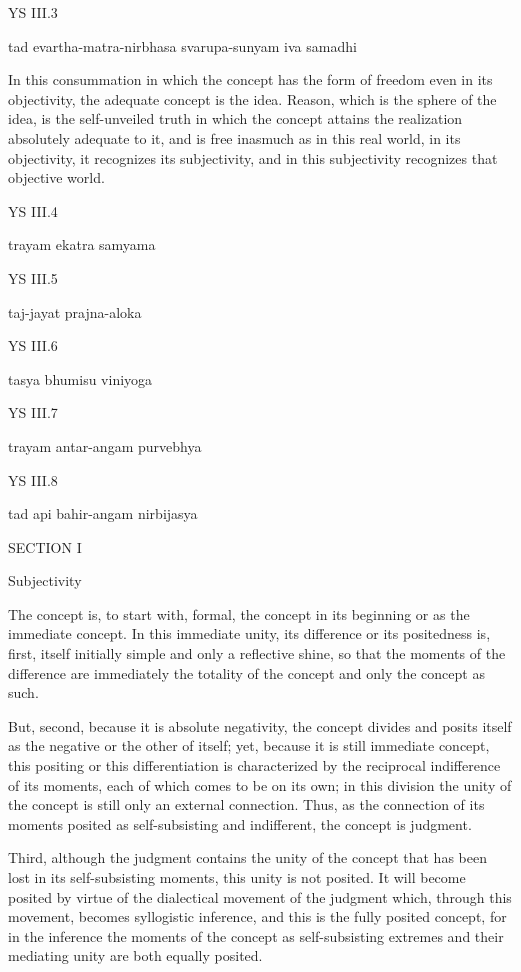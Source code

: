 YS III.3

    tad evartha-matra-nirbhasa svarupa-sunyam iva samadhi

In this consummation in which
the concept has the form of freedom
even in its objectivity,
the adequate concept is the idea.
Reason, which is the sphere of the idea,
is the self-unveiled truth
in which the concept attains
the realization absolutely adequate to it,
and is free inasmuch as in this real world,
in its objectivity, it recognizes its subjectivity,
and in this subjectivity recognizes that objective world.

YS III.4

    trayam ekatra samyama

YS III.5

    taj-jayat prajna-aloka

YS III.6

    tasya bhumisu viniyoga

YS III.7

    trayam antar-angam purvebhya

YS III.8

    tad api bahir-angam nirbijasya

SECTION I

Subjectivity

The concept is, to start with, formal,
the concept in its beginning
or as the immediate concept.
In this immediate unity,
its difference or its positedness
is, first, itself initially simple
and only a reflective shine,
so that the moments of the difference
are immediately the totality of the concept
and only the concept as such.

But, second, because it is absolute negativity,
the concept divides and posits itself
as the negative or the other of itself;
yet, because it is still immediate concept,
this positing or this differentiation is
characterized by the reciprocal
indifference of its moments,
each of which comes to be on its own;
in this division the unity of the concept is
still only an external connection.
Thus, as the connection of its moments
posited as self-subsisting and indifferent,
the concept is judgment.

Third, although the judgment contains
the unity of the concept that has been lost
in its self-subsisting moments,
this unity is not posited.
It will become posited by virtue of
the dialectical movement of the judgment
which, through this movement,
becomes syllogistic inference,
and this is the fully posited concept,
for in the inference the moments of
the concept as self-subsisting extremes
and their mediating unity are both equally posited.

